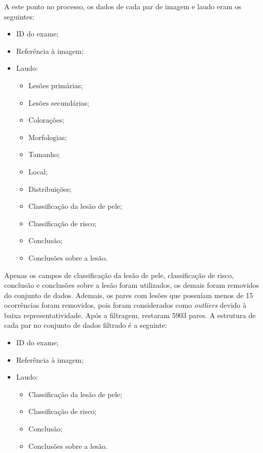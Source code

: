 A este ponto no processo, os dados de cada par de imagem e laudo eram os seguintes:

\begin{itemize}
    \item \ac{ID} do exame;
    \item Referência à imagem;
    \item Laudo:
          \begin{itemize}
              \item Lesões primárias;
              \item Lesões secundárias;
              \item Colorações;
              \item Morfologias;
              \item Tamanho;
              \item Local;
              \item Distribuições;
              \item Classificação da lesão de pele;
              \item Classificação de risco;
              \item Conclusão;
              \item Conclusões sobre a lesão.
          \end{itemize}
\end{itemize}

Apenas os campos de classificação da lesão de pele, classificação de risco, conclusão e conclusões sobre a lesão foram
utilizados, os demais foram removidos do conjunto de dados. Ademais, os pares com lesões que possuíam menos de 15
ocorrências foram removidos, pois foram considerados como \textit{outliers} devido à baixa representatividade. Após a
filtragem, restaram 5903 pares. A estrutura de cada par no conjunto de dados filtrado é a seguinte:

\begin{itemize}
    \item \ac{ID} do exame;
    \item Referência à imagem;
    \item Laudo:
          \begin{itemize}
              \item Classificação da lesão de pele;
              \item Classificação de risco;
              \item Conclusão;
              \item Conclusões sobre a lesão.
          \end{itemize}
\end{itemize}

